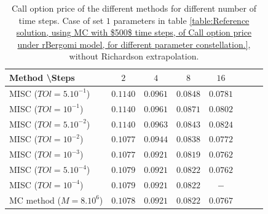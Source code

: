 \documentclass[11pt]{article}
\begin{document}
\begin{table}[h!]
	\centering
	\begin{tabular}{l*{6}{c}r}
		Method \textbackslash  Steps            & $2$ & $4$ & $8$ & $16$ &   \\
		\hline
		MISC ($TOl=5.10^{-1}$)  & $0.1140$ & $0.0961$ & $0.0848$ & $0.0781$  \\
		MISC ($TOl=10^{-1}$)  & $0.1140$ & $0.0961$ & $0.0871$ & $0.0802$  \\
		MISC ($TOl=5.10^{-2}$)  & $0.1140$ & $0.0963$ & $0.0843$ & $0.0824$  \\
		MISC ($TOl=10^{-2}$)  & $0.1077$ & $0.0944$ & $0.0838$ & $0.0772$  \\
		MISC ($TOl=10^{-3}$)  & $0.1077$ & $0.0921$ & $0.0819$ & $0.0762$  \\
			MISC ($TOl=5.10^{-4}$)  & $0.1079   $ & $0.0921$ & $0.0822$ & $0.0762$  \\
		MISC ($TOl=10^{-4}$)  & $0.1079$ & $0.0921$ & $0.0822$ & $-$  \\
		\hline
		MC method ($M=8.10^{6}$)   & $  0.1078$ & $ 0.0921
		$  & $   0.0822
		$ & $ 0.0767$ \\		
		
		\hline
	\end{tabular}
	\caption{ Call option price of the different methods for different number of time steps. Case of set $1$ parameters in table \ref{table:Reference solution, using MC with $500$ time steps, of Call option price under rBergomi model, for different parameter constellation.}, without Richardson extrapolation.}
	\label{table: Call option price of the different methods for different number of time steps. Case set 1}
\end{table}
\end{document}
